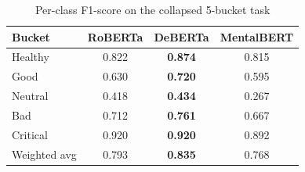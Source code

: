 \documentclass[conference]{IEEEtran}
\makeatletter
\let\end\a@l@end
\makeatother
\begin{document}
\begin{table}[ht]
\centering
\caption{Per-class F1-score on the 10-class severity task.}
\label{tab:ft_perclass_f1}
\end{table}

\begin{table}[ht]
\centering
\caption{Per-class F1-score on the collapsed 5-bucket task}
\label{tab:ft_bucket_f1}
\begin{tabular}{lccc}
\toprule
Bucket & RoBERTa & DeBERTa & MentalBERT \\
\midrule
Healthy  & 0.822 & \textbf{0.874} & 0.815 \\
Good     & 0.630 & \textbf{0.720} & 0.595 \\
Neutral  & 0.418 & \textbf{0.434} & 0.267 \\
Bad      & 0.712 & \textbf{0.761} & 0.667 \\
Critical & 0.920 & \textbf{0.920} & 0.892 \\
\midrule
Weighted avg & 0.793 & \textbf{0.835} & 0.768 \\
\bottomrule
\end{tabular}
\end{table}
\end{document}
